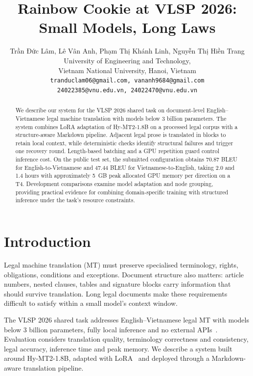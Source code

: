 \documentclass[11pt]{article}
\begin{document}
\title{Rainbow Cookie at VLSP 2026: Small Models, Long Laws}

\author{Trần Đức Lâm, Lê Vân Anh, Phạm Thị Khánh Linh, Nguyễn Thị Hiền Trang \\
University of Engineering and Technology, \\
Vietnam National University, Hanoi, Vietnam \\
\texttt{\small tranduclam06@gmail.com, vananh9684@gmail.com} \\
\texttt{\small 24022385@vnu.edu.vn, 24022470@vnu.edu.vn}}

\maketitle

\begin{abstract}
We describe our system for the VLSP 2026 shared task on document-level English--Vietnamese legal machine translation with models below 3 billion parameters. The system combines LoRA adaptation of Hy-MT2-1.8B on a processed legal corpus with a structure-aware Markdown pipeline. Adjacent legal prose is translated in blocks to retain local context, while deterministic checks identify structural failures and trigger one recovery round. Length-based batching and a GPU repetition guard control inference cost. On the public test set, the submitted configuration obtains 70.87 BLEU for English-to-Vietnamese and 47.44 BLEU for Vietnamese-to-English, taking 2.0 and 1.4 hours with approximately 5~GB peak allocated GPU memory per direction on a T4. Development comparisons examine model adaptation and node grouping, providing practical evidence for combining domain-specific training with structured inference under the task's resource constraints.
\end{abstract}

\section{Introduction}
Legal machine translation (MT) must preserve specialised terminology, rights, obligations, conditions and exceptions. Document structure also matters: article numbers, nested clauses, tables and signature blocks carry information that should survive translation. Long legal documents make these requirements difficult to satisfy within a small model's context window.

The VLSP 2026 shared task addresses English--Vietnamese legal MT with models below 3 billion parameters, fully local inference and no external APIs~\cite{vlsp2026}. Evaluation considers translation quality, terminology correctness and consistency, legal accuracy, inference time and peak memory. We describe a system built around Hy-MT2-1.8B, adapted with LoRA~\cite{hu2022lora} and deployed through a Markdown-aware translation pipeline.
\end{document}
